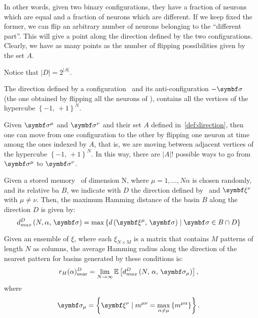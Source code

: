 \documentclass[\rootdir/main.tex]{subfiles}
\begin{document}
In other words, given two binary configurations, they have a fraction of neurons which are equal and a fraction of neurons which are different. If we keep fixed the former, we can flip an arbitrary number of neurons belonging to the ``different part''. This will give a point along the direction defined by the two configurations. Clearly, we have as many points as the number of flipping possibilities given by the set ${A}$.
\begin{remark}
    Notice that $|{D}| = 2^{|{A}|}$.
\end{remark}
\begin{remark}
    The direction defined by a configuration \bsigma\ and its anti-configuration $- \bsigma$ (\ie the one obtained by flipping all the neurons of \bsigma), contains all the vertices of the hypercube $\left\{-1, \, +1 \right\}^N$.
\end{remark}
\begin{remark}
    Given $\bsigma^\mu$ and $\bsigma^\nu$ and their set $A$ defined in~\cref{def:direction}, then one can move from one configuration to the other by flipping one neuron at time among the ones indexed by $A$, that is, we are moving between adjacent vertices of the hypercube $\left\{-1, \, +1\right\}^N$. In this way, there are $|A|!$ possible ways to go from $\bsigma^\mu$ to $\bsigma^\nu$.
\end{remark}
\begin{definition}
    Given a stored memory \bxi\ of dimension N, where $\mu = 1, \dots, N\alpha$ is chosen randomly, and its relative \acrlong{ba} ${B}$, we indicate with ${D}$ the direction defined by \bxi\ and $\bxi[\nu]$ with $\mu \neq \nu$. Then, the maximum Hamming distance of the basin ${B}$ along the direction ${D}$ is given by:
    \begin{equation}
        d_{max}^{{D}} \left( N, \alpha, \, \bsigma \right) = \max \left\{ d\left( \bxi, \, \bsigma \right) \mid \bsigma \in {B} \cap {D} \right\}
    \end{equation}
\end{definition}
\begin{definition}
    Given an ensemble of $\xi$, where each $\xi_{N \times M}$ is
    a matrix that contains $M$ patterns of length $N$ as columns, the average Hamming radius along the direction of the nearest pattern for basins generated by these conditions is:
    \begin{equation}
        r_{H}(\alpha)_{\text{near}}^{{D}} = \lim_{N \to \infty} \mathbb{E} \left[ d_{max}^{{D}} \left( N, \, \alpha, \, \bsigma_\mu \right) \right], 
    \end{equation}
    where
    \begin{equation*}
        \bsigma_{\mu} = \left\{ \bxi[\nu] \mid m^{\mu \nu} = \max_{\alpha \neq \mu}\left\{ m^{\mu \alpha} \right\} \right\}.
    \end{equation*}
\end{definition}
\end{document}
